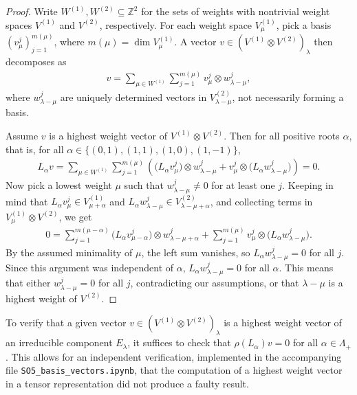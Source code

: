 \documentclass[11pt,reqno]{amsart}
\theoremstyle{remark}
\theoremstyle{definition}
\begin{document}
\begin{proof}
    Write $W^{(1)},W^{(2)} \subseteq \mathbb Z^2$ for the sets of weights with nontrivial weight spaces $V^{(1)}$ and $V^{(2)}$, respectively. For each weight space $V^{(1)}_\mu$, pick a basis $(v_\mu^{j})_{j=1}^{m(\mu)}$, where $m(\mu) = \dim V^{(1)}_\mu$. A vector $v \in (V^{(1)} \otimes V^{(2)})_\lambda$ then decomposes as
    \begin{align*}
        v = \sum_{\mu \in W^{(1)}} \sum_{j=1}^{m(\mu)} v_{\mu}^j \otimes w_{\lambda - \mu}^j,
    \end{align*}
    where $w_{\lambda-\mu}^j$ are uniquely determined vectors in $V^{(2)}_{\lambda-\mu}$, not necessarily forming a basis.

    Assume $v$ is a highest weight vector of $V^{(1)} \otimes V^{(2)}$. Then for all positive roots $\alpha$, that is, for all $\alpha \in \{(0,1),(1,1),(1,0),(1,-1)\}$,
    \begin{align*}
        L_\alpha v = \sum_{\mu \in W^{(1)}} \sum_{j=1}^{m(\mu)} \left( \big(L_\alpha v_{\mu}^j\big) \otimes w_{\lambda - \mu}^j + v_{\mu}^j \otimes \big(L_\alpha w_{\lambda - \mu}^j\big) \right) = 0.
    \end{align*}
    Now pick a lowest weight $\mu$ such that $w_{\lambda-\mu}^j \neq 0$ for at least one $j$. Keeping in mind that $L_\alpha v_\mu^j \in V_{\mu+\alpha}^{(1)}$ and $L_\alpha w_{\lambda - \mu}^j \in V_{\lambda - \mu + \alpha}^{(2)}$, and collecting terms in $V^{(1)}_\mu \otimes V^{(2)}$, we get
    \begin{align*}
        0 = \sum_{j=1}^{m(\mu-\alpha)} \big(L_\alpha v_{\mu-\alpha}^j\big) \otimes w_{\lambda - \mu + \alpha }^j + \sum_{j=1}^{m(\mu)} v_{\mu}^j \otimes \big(L_\alpha w_{\lambda - \mu}^j\big).
    \end{align*}
    By the assumed minimality of $\mu$, the left sum vanishes, so $L_{\alpha} w^j_{\lambda - \mu} = 0$ for all $j$. Since this argument was independent of $\alpha$, $L_{\alpha} w^j_{\lambda - \mu} = 0$ for all $\alpha$. This means that either $w^j_{\lambda - \mu} = 0$ for all $j$, contradicting our assumptions, or that $\lambda - \mu$ is a highest weight of $V^{(2)}$.
\end{proof}

To verify that a given vector $v \in (V^{(1)} \otimes V^{(2)})_{\lambda}$ is a highest weight vector of an irreducible component $E_\lambda$, it suffices to check that $\rho(L_\alpha) v = 0$ for all $\alpha \in \Lambda_+$. This allows for an independent verification, implemented in the accompanying file \texttt{SO5\_basis\_vectors.ipynb}, that the computation of a highest weight vector in a tensor representation did not produce a faulty result.
\end{document}
